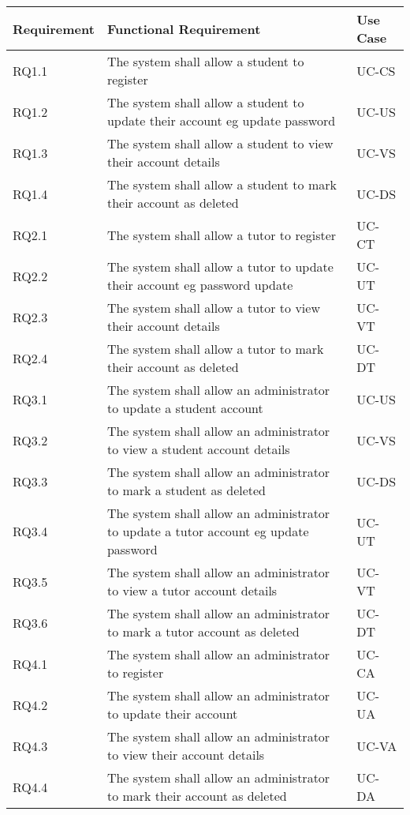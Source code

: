 \documentclass[12pt]{article}
\begin{document}
{
\centering
\begin{longtable}{| l | p{10cm}| l |}
			\hline			
			\textbf{Requirement} & \textbf{Functional Requirement} & \textbf{Use Case}
			
			\\ \hline RQ1.1 & The system shall allow a student to register  & UC-CS \\ \hline 
			RQ1.2 & The system shall allow a student to update their account eg update password& UC-US \\ \hline  
			RQ1.3 & The system shall allow a student to view their account details  & UC-VS \\ \hline 
			RQ1.4 & The system shall allow a student to mark their account as deleted & UC-DS  \\ \hline 

			RQ2.1 & The system shall allow a tutor to register & UC-CT \\ \hline
			RQ2.2 & The system shall allow a tutor to update their account eg password update & UC-UT \\ \hline
			RQ2.3 & The system shall allow a tutor to view their account details & UC-VT \\ \hline
			RQ2.4 & The system shall allow a tutor to mark their account as deleted & UC-DT \\ \hline  

			RQ3.1 & The system shall allow an administrator to update a student account & UC-US \\ \hline  
			RQ3.2 & The system shall allow an administrator to view a student account details  & UC-VS \\ \hline 
			RQ3.3 & The system shall allow an administrator to mark a student as deleted & UC-DS  \\ \hline 
			RQ3.4 & The system shall allow an administrator to update a tutor account eg update password & UC-UT \\ \hline
			RQ3.5 & The system shall allow an administrator to view a tutor account details & UC-VT \\ \hline
			RQ3.6 & The system shall allow an administrator to mark a tutor account as deleted & UC-DT \\ \hline
			 
			
			RQ4.1 & The system shall allow an administrator to register  & UC-CA \\ \hline 
			RQ4.2 & The system shall allow an administrator to update their account & UC-UA \\ \hline  
			RQ4.3 & The system shall allow an administrator to view their account details  & UC-VA \\ \hline 
			RQ4.4 & The system shall allow an administrator to mark their account as deleted & UC-DA  \\ \hline 


\end{longtable}}
\end{document}
